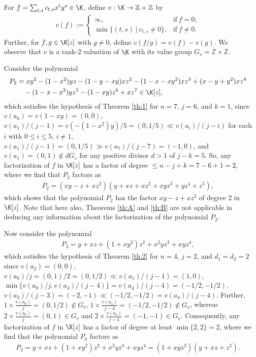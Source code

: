 \documentclass[12pt]{amsart}%
\begin{document}
For $f=\sum_{t,s}c_{t,s}x^ty^s \in \K$, define $v:\K \rightarrow \mathbb{Z} \times \mathbb{Z}$ by
		\begin{eqnarray*}
			v(f):=\begin{cases} \infty, & \text{if}~ f=0;\\
				\min\{(t,s)~|~c_{t,s}\neq 0\}, & \text{if}~ f\neq 0.
			\end{cases}
		\end{eqnarray*}
Further, for $f,g \in \K[z]$ with $g\neq 0$, define $v(f/g)=v(f)-v(g)$. We observe that $v$ is a rank-2 valuation of $\K$ with its value group $G_v=\mathbb{Z} \times \mathbb{Z}$.
\begin{example} Consider the polynomial
		\begin{align*}
			P_2 &= xy^2-(1-x^2)yz-(1-y-xy)xz^2-(1-x-xy^2)xz^3+(x-y+y^2)xz^4\\
			&\quad- (1-x-x^2)yz^5-(1-xy)z^6+xz^7\in \K[z],
		\end{align*}
which satisfies the hypothesis of Theorem \ref{th:1} for $n=7$, $j=6$, and $k=1$, since $v(a_6)=v(1-xy)=(0,0)$, $v(a_1)/(j-1)=v(-(1-x^2)y)/5=(0,1/5)\ll v(a_i)/(j-i)$ for each $i$ with $0\leq i\leq 5$, $i\neq 1$, $v(a_1)/(j-1)=(0,1/5)\gg  v(a_7)/(j-7)=(-1,0)$, and $v(a_1)=(0,1)\notin dG_v$ for any positive divisor $d>1$ of $j-k=5$. So, any factorization of $f$ in $\K[z]$ has a factor of degree $\leq n-j+k=7-6+1=2$, where we find that $P_2$ factors as
		\begin{eqnarray*}
			P_2=(xy-z+xz^2)(y+xz+xz^2+xyz^3+yz^4+z^5),
		\end{eqnarray*}
which shows that the polynomial $P_2$ has the factor $xy-z+xz^2$ of degree 2 in $\K[z]$. Note that here also, Theorems \ref{th:A} and \ref{th:B} are not applicable in deducing  any information about the factorization of the polynomial $P_2$.
	\end{example}
\begin{example}
    Now consider the polynomial
	\begin{eqnarray*}
		P_3=y+xz+(1+xy^2)z^2+x^2yz^3+xyz^4,
	\end{eqnarray*}
	which satisfies the hypothesis of Theorem \ref{th:2} for $n=4$, $j=2$, and $d_1=d_2=2$ since $v(a_2)=(0,0)$, $v(a_0)/j=(0,1)/2=(0,1/2)\ll v(a_1)/(j-1)=(1,0)$, $\min\{v(a_0)/j,v(a_4)/(j-4)\}=v(a_4)/(j-4)=(-1/2,-1/2)$. $v(a_3)/(j-3)=(-2,-1)\ll(-1/2,-1/2)=v(a_4)/(j-4)$. Further,  
$1\times \frac{v(a_0)}{j}=(0,1/2) \notin G_v$, $1\times \frac{v(a_4)}{j-4}=(-1/2,-1/2)\notin G_v$, whereas $2\times \frac{v(a_0)}{j}=(0,1) \in G_v$ and $2\times \frac{v(a_4)}{j-4}=(-1,-1)\in G_v$. Consequently, any factorization of $f$ in $\K[z]$ has a factor of degree at least $\min\{2,2\}=2$, where we find that the polynomial $P_3$ factors as  
	\begin{eqnarray*}
		P_3=y+xz+(1+xy^2)z^2+x^2yz^3+xyz^4 =(1+xyz^2)(y+xz+z^2).
	\end{eqnarray*}
\end{example}
\end{document}
